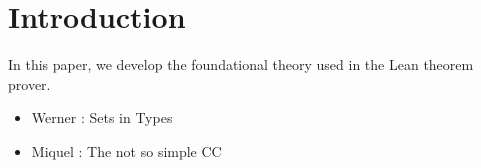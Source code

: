 \section{Introduction}
In this paper, we develop the foundational theory used in the Lean theorem prover.

\begin{itemize}
\item Werner \cite{setsintypes}: Sets in Types
\item Miquel \cite{notsosimple}: The not so simple CC
\end{itemize}
